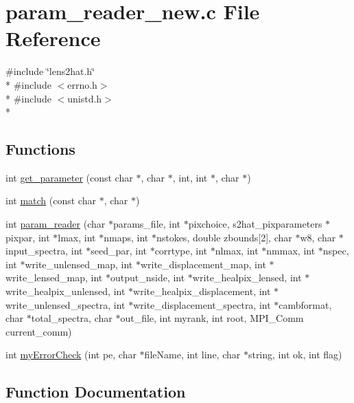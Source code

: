 \section{param\-\_\-reader\-\_\-new.\-c File Reference}
\label{param__reader__new_8c}
{\ttfamily \#include \char`\"{}lens2hat.\-h\char`\"{}}\\*
{\ttfamily \#include $<$errno.\-h$>$}\\*
{\ttfamily \#include $<$unistd.\-h$>$}\\*
\subsection*{Functions}
\begin{DoxyCompactItemize}
\item 
int \hyperlink{param__reader__new_8c_aa58f4ecc3318546d08e4282c739db7a3}{get\-\_\-parameter} (const char $\ast$, char $\ast$, int, int $\ast$, char $\ast$)
\item 
int \hyperlink{param__reader__new_8c_af71971b64e93dd85136d531400035e57}{match} (const char $\ast$, char $\ast$)
\item 
int \hyperlink{param__reader__new_8c_a990ccd7e0b3352322502e77838c159d7}{param\-\_\-reader} (char $\ast$params\-\_\-file, int $\ast$pixchoice, s2hat\-\_\-pixparameters $\ast$pixpar, int $\ast$lmax, int $\ast$nmaps, int $\ast$nstokes, double zbounds\mbox{[}2\mbox{]}, char $\ast$w8, char $\ast$input\-\_\-spectra, int $\ast$seed\-\_\-par, int $\ast$corrtype, int $\ast$nlmax, int $\ast$nmmax, int $\ast$nspec, int $\ast$write\-\_\-unlensed\-\_\-map, int $\ast$write\-\_\-displacement\-\_\-map, int $\ast$write\-\_\-lensed\-\_\-map, int $\ast$output\-\_\-nside, int $\ast$write\-\_\-healpix\-\_\-lensed, int $\ast$write\-\_\-healpix\-\_\-unlensed, int $\ast$write\-\_\-healpix\-\_\-displacement, int $\ast$write\-\_\-unlensed\-\_\-spectra, int $\ast$write\-\_\-displacement\-\_\-spectra, int $\ast$cambformat, char $\ast$total\-\_\-spectra, char $\ast$out\-\_\-file, int myrank, int root, M\-P\-I\-\_\-\-Comm current\-\_\-comm)
\item 
int \hyperlink{param__reader__new_8c_a70bcbd531a6e4abc62d73f5b4532c2cc}{my\-Error\-Check} (int pe, char $\ast$file\-Name, int line, char $\ast$string, int ok, int flag)
\end{DoxyCompactItemize}


\subsection{Function Documentation}
